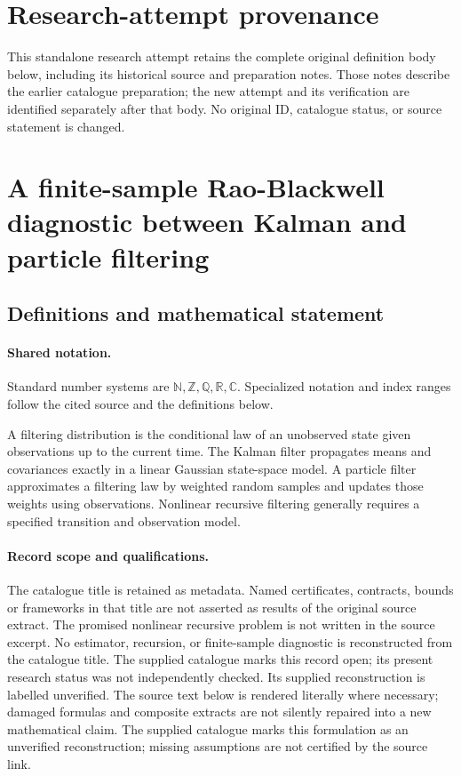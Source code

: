 \documentclass[11pt]{article}
\begin{document}
\section*{Research-attempt provenance}
This standalone research attempt retains the complete original definition body below,
including its historical source and preparation notes. Those notes describe the
earlier catalogue preparation; the new attempt and its verification are identified
separately after that body. No original ID, catalogue status, or source statement is changed.

\section{A finite-sample Rao-Blackwell diagnostic between Kalman and particle filtering}\label{statement}

\subsection{Definitions and mathematical statement}

\paragraph{Shared notation.}Standard number systems are $\mathbb N,\mathbb Z,\mathbb Q,\mathbb R,\mathbb C$. Specialized notation and index ranges follow the cited source and the definitions below.


A filtering distribution is the conditional law of an unobserved state given observations up to the current time. The Kalman filter propagates means and covariances exactly in a linear Gaussian state-space model. A particle filter approximates a filtering law by weighted random samples and updates those weights using observations. Nonlinear recursive filtering generally requires a specified transition and observation model.
\paragraph{Record scope and qualifications.}
The catalogue title is retained as metadata. Named certificates, contracts, bounds or frameworks in that title are not asserted as results of the original source extract.
The promised nonlinear recursive problem is not written in the source excerpt. No estimator, recursion, or finite-sample diagnostic is reconstructed from the catalogue title. The supplied catalogue marks this record open; its present research status was not independently checked. Its supplied reconstruction is labelled unverified.
The source text below is rendered literally where necessary; damaged formulas and composite extracts are not silently repaired into a new mathematical claim.
The supplied catalogue marks this formulation as an unverified reconstruction; missing assumptions are not certified by the source link.
\end{document}
